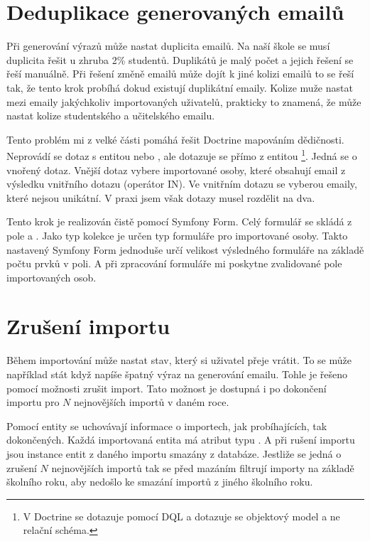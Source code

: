 \section{Deduplikace generovaných emailů}

Při generování výrazů může nastat duplicita emailů.
Na naší škole se musí duplicita řešit u zhruba 2\% studentů.
Duplikátů je malý počet a jejich řešení se řeší manuálně.
Při řešení změně emailů může dojít k jiné kolizi emailů to se řeší tak, že tento krok probíhá dokud existují duplikátní emaily. Kolize muže nastat mezi emaily jakýchkoliv importovaných uživatelů, prakticky to znamená, že může nastat kolize studentského a učitelského emailu.

Tento problém mi z velké části pomáhá řešit Doctrine mapováním dědičnosti.
Neprovádí se dotaz s entitou  nebo , ale dotazuje se přímo z entitou \footnote{V Doctrine se dotazuje pomocí DQL a dotazuje se objektový model a ne relační schéma.}.
Jedná se o vnořený dotaz.
Vnější dotaz vybere importované osoby, které obsahují email z výsledku vnitřního dotazu (operátor \textsc{IN}).
Ve vnitřním dotazu se vyberou emaily, které nejsou unikátní. V praxi jsem však dotazy musel rozdělit na dva.

Tento krok je realizován čistě pomocí Symfony Form. Celý formulář se skládá z pole  a .
  Jako typ kolekce je určen typ formuláře pro importované osoby. Takto nastavený Symfony Form jednoduše určí velikost výsledného formuláře na základě počtu prvků v poli. A při zpracování formuláře mi poskytne zvalidované pole importovaných osob.

\section{Zrušení importu}

Během importování může nastat stav, který si uživatel přeje vrátit.
To se může například stát když napíše špatný výraz na generování emailu.
Tohle je řešeno pomocí možnosti zrušit import.
Tato možnost je dostupná i po dokončení importu pro $N$ nejnovějších importů v daném roce.

Pomocí entity  se uchovávají informace o importech, jak probíhajících, tak dokončených.
Každá importovaná entita má atribut  typu  .
A při rušení importu jsou instance entit z daného importu smazány z databáze.
Jestliže se jedná o zrušení $N$ nejnovějších importů tak se před mazáním filtrují importy na základě školního roku, aby nedošlo ke smazání importů z jiného školního roku.
